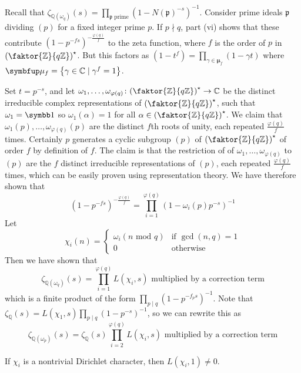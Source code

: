 Recall that \( \zeta_{\mathbb Q(\omega_q)}(s) = \prod_{\mathfrak p \text{ prime}} (1 - N(\mathfrak p)^{-s})^{-1} \).
Consider prime ideals \( \mathfrak p \) dividing \( (p) \) for a fixed integer prime \( p \).
If \( p \nmid q \), part (vi) shows that these contribute \( (1 - p^{-fs})^{-\frac{\varphi(q)}{f}} \) to the zeta function, where \( f \) is the order of \( p \) in \( \qty(\faktor{\mathbb Z}{q\mathbb Z})^\star \).
But this factors as \( (1 - t^f) = \prod_{\gamma \in \bm\mu_f}(1 - \gamma t) \) where \( \bm\mu_f = \qty{\gamma \in \mathbb C \mid \gamma^f = 1} \).

Set \( t = p^{-s} \), and let \( \omega_1, \dots, \omega_{\varphi(q)} \colon \qty(\faktor{\mathbb Z}{q\mathbb Z})^\star \to \mathbb C \) be the distinct irreducible complex representations of \( \qty(\faktor{\mathbb Z}{q\mathbb Z})^\star \), such that \( \omega_1 = \symbb 1 \) so \( \omega_1(\alpha) = 1 \) for all \( \alpha \in \qty(\faktor{\mathbb Z}{q\mathbb Z})^\star \).
We claim that \( \omega_1(p), \dots, \omega_{\varphi(q)}(p) \) are the distinct \( f \)th roots of unity, each repeated \( \frac{\varphi(q)}{f} \) times.
Certainly \( p \) generates a cyclic subgroup \( (p) \) of \( \qty(\faktor{\mathbb Z}{q\mathbb Z})^\star \) of order \( f \) by definition of \( f \).
The claim is that the restriction of of \( \omega_1, \dots, \omega_{\varphi(q)} \) to \( (p) \) are the \( f \) distinct irreducible representations of \( (p) \), each repeated \( \frac{\varphi(q)}{f} \) times, which can be easily proven using representation theory.
We have therefore shown that
\[ (1-p^{-fs})^{-\frac{\varphi(q)}{f}} = \prod_{i=1}^{\varphi(q)} (1 - \omega_i(p) p^{-s})^{-1} \]
Let
\[ \chi_i(n) = \begin{cases}
    \omega_i (n \text{ mod } q) & \text{if } \gcd(n,q) = 1 \\
    0 & \text{otherwise}
\end{cases} \]
Then we have shown that
\[ \zeta_{\mathbb Q(\omega_q)}(s) = \prod_{i=1}^{\varphi(q)} L(\chi_i, s) \text{ multiplied by a correction term} \]
which is a finite product of the form \( \prod_{p \mid q} (1 - p^{-f_p s})^{-1} \).
Note that \( \zeta_{\mathbb Q}(s) = L(\chi_1, s) \prod_{p \mid q}(1-p^{-s})^{-1} \), so we can rewrite this as
\[ \zeta_{\mathbb Q(\omega_p)}(s) = \zeta_{\mathbb Q}(s) \prod_{i=2}^{\varphi(q)}L(\chi_i, s) \text{ multiplied by a correction term} \]
\begin{theorem}
    If \( \chi_i \) is a nontrivial Dirichlet character, then \( L(\chi_i, 1) \neq 0 \).
\end{theorem}
